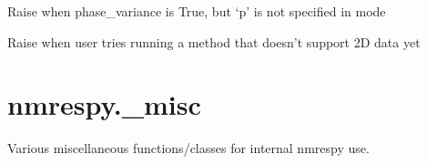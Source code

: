 \documentclass[letterpaper,10pt,english]{sphinxmanual}
\begin{document}
\begin{fulllineitems}
\label{\detokenize{references/errors:nmrespy._errors.PhaseVarianceAmbiguityError}}
\sphinxAtStartPar
Raise when phase\_variance is True, but ‘p’ is not specified in mode

\end{fulllineitems}


\begin{fulllineitems}
\label{\detokenize{references/errors:nmrespy._errors.TwoDimUnsupportedError}}
\sphinxAtStartPar
Raise when user tries running a method that doesn’t support 2D
data yet

\end{fulllineitems}





\section{nmrespy.\_misc}
\label{\detokenize{references/misc:module-nmrespy._misc}}\label{\detokenize{references/misc:nmrespy-misc}}\label{\detokenize{references/misc::doc}}
\sphinxAtStartPar
Various miscellaneous functions/classes for internal nmrespy use.
\end{document}
